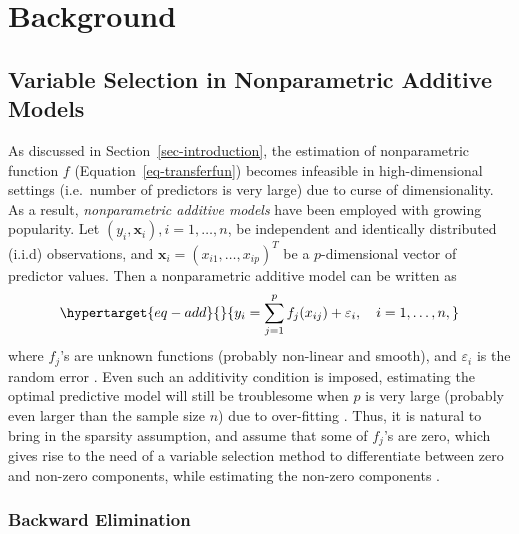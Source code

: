 \documentclass[11pt,a4paper,]{article}
\begin{document}
\hypertarget{sec-background}{%
\section{Background}\label{sec-background}}

\hypertarget{variable-selection-in-nonparametric-additive-models}{%
\subsection{Variable Selection in Nonparametric Additive
Models}\label{variable-selection-in-nonparametric-additive-models}}

As discussed in Section~\ref{sec-introduction}, the estimation of
nonparametric function \(f\) (Equation~\ref{eq-transferfun}) becomes
infeasible in high-dimensional settings (i.e.~number of predictors is
very large) due to curse of dimensionality. As a result,
\emph{nonparametric additive models} have been employed with growing
popularity. Let \((y_{i}, \bm{x}_{i}), i = 1, \dots, n\), be independent
and identically distributed (i.i.d) observations, and
\(\bm{x}_{i} = (x_{i1}, \dots, x_{ip})^{T}\) be a \(p\)-dimensional
vector of predictor values. Then a nonparametric additive model can be
written as \begin{equation}\protect\hypertarget{eq-add}{}{
 y_{i} = \sum_{j=1}^{p} {f_{j}(x_{ij})} + \varepsilon_{i}, \quad i = 1, \dots, n,
}\label{eq-add}\end{equation} where \(f_{j}\)'s are unknown functions
(probably non-linear and smooth), and \(\varepsilon_{i}\) is the random
error \autocite{Lian2012}. Even such an additivity condition is imposed,
estimating the optimal predictive model will still be troublesome when
\(p\) is very large (probably even larger than the sample size \(n\))
due to over-fitting \autocite{Lian2012}. Thus, it is natural to bring in
the sparsity assumption, and assume that some of \(f_{j}\)'s are zero,
which gives rise to the need of a variable selection method to
differentiate between zero and non-zero components, while estimating the
non-zero components \autocite{Huang2010}.

\hypertarget{sec-backward}{%
\subsubsection{Backward Elimination}\label{sec-backward}}
\end{document}
